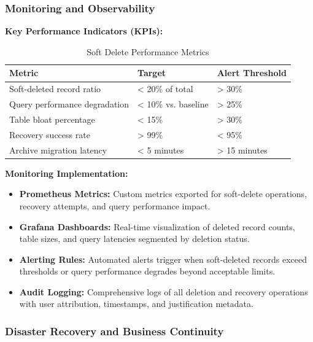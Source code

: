 \documentclass[12pt,a4paper]{article}
\begin{document}
\subsubsection{Monitoring and Observability}

\textbf{Key Performance Indicators (KPIs):}

\begin{table}[H]
\centering
\begin{tabular}{|p{5cm}|p{4cm}|p{4cm}|}
\hline
\textbf{Metric} & \textbf{Target} & \textbf{Alert Threshold} \\
\hline
Soft-deleted record ratio & < 20\% of total & > 30\% \\
\hline
Query performance degradation & < 10\% vs. baseline & > 25\% \\
\hline
Table bloat percentage & < 15\% & > 30\% \\
\hline
Recovery success rate & > 99\% & < 95\% \\
\hline
Archive migration latency & < 5 minutes & > 15 minutes \\
\hline
\end{tabular}
\caption{Soft Delete Performance Metrics}
\end{table}

\vspace{0.5em}

\textbf{Monitoring Implementation:}

\begin{itemize}[leftmargin=2em, itemsep=6pt]
    \item \textbf{Prometheus Metrics:} Custom metrics exported for soft-delete operations, recovery attempts, and query performance impact.
    \item \textbf{Grafana Dashboards:} Real-time visualization of deleted record counts, table sizes, and query latencies segmented by deletion status.
    \item \textbf{Alerting Rules:} Automated alerts trigger when soft-deleted records exceed thresholds or query performance degrades beyond acceptable limits.
    \item \textbf{Audit Logging:} Comprehensive logs of all deletion and recovery operations with user attribution, timestamps, and justification metadata.
\end{itemize}

\subsubsection{Disaster Recovery and Business Continuity}
\end{document}
